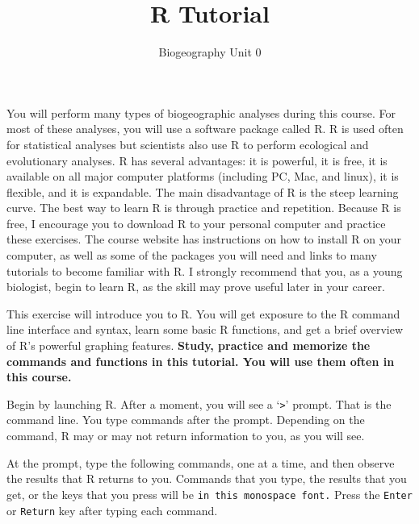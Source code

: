 \documentclass[11pt]{article}
\title{R Tutorial}
\author{Biogeography Unit 0}
\date{}                                           %
\begin{document}
\maketitle
\thispagestyle{plain}

You will perform many types of biogeographic analyses during this
course. For most of these analyses, you will use a software package
called R. R is used often for statistical analyses but scientists also
use R to perform ecological and evolutionary analyses. R has several
advantages: it is powerful, it is free, it is available on all major
computer platforms (including PC, Mac, and linux), it is flexible, and
it is expandable. The main disadvantage of R is the steep learning
curve. The best way to learn R is through practice and repetition.
Because R is free, I encourage you to download R to your personal
computer and practice these exercises. The course website has
instructions on how to install R on your computer, as well as some of
the packages you will need and links to many tutorials to become
familiar with R. I strongly recommend that you, as a young biologist,
begin to learn R, as the skill may prove useful later in your career.

This exercise will introduce you to R. You will get exposure to the R
command line interface and syntax, learn some basic R functions, and get
a brief overview of R's powerful graphing features. \textbf{Study,
practice and memorize the commands and functions in this tutorial. You
will use them often in this course.}

Begin by launching R. After a moment, you will see a `\texttt{\textgreater{}}'
prompt. That is the command line. You type commands after the prompt.
Depending on the command, R may or may not return information to you, as
you will see.

At the prompt, type the following commands, one at a time, and then
observe the results that R returns to you. Commands that you type, the
results that you get, or the keys that you press will be \texttt{in this monospace
font.} Press the \texttt{Enter} or \texttt{Return} key after typing each command.
\end{document}
